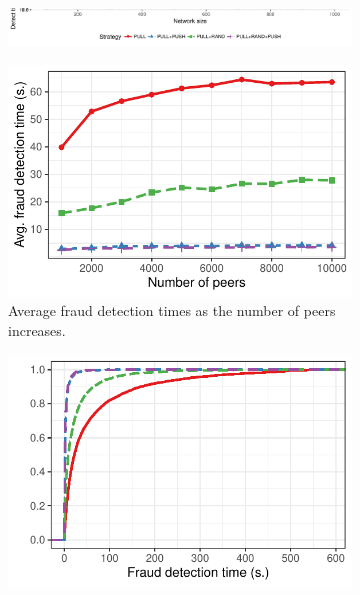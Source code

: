 \begin{figure}[t]
	\centering
	\begin{subfigure}{.8\columnwidth}
		\centering
		\includegraphics[width=\linewidth]{trustchain/assets/fraud_experiments_legend}
	\end{subfigure}
	\begin{subfigure}{.5\columnwidth}
		\centering
		\captionsetup{width=.9\linewidth}
		\includegraphics[width=\linewidth]{trustchain/assets/fraud_times_scalability}
		\caption{Average fraud detection times as the number of peers increases.}
		\label{fig:experiment_scalability_detection_times}
	\end{subfigure}%
	\begin{subfigure}{.5\columnwidth}
		\centering
		\captionsetup{width=.9\linewidth}
		\includegraphics[width=\columnwidth]{trustchain/assets/fraud_times_scalability_5000_ecdf}

\end{subfigure}
\end{figure}
